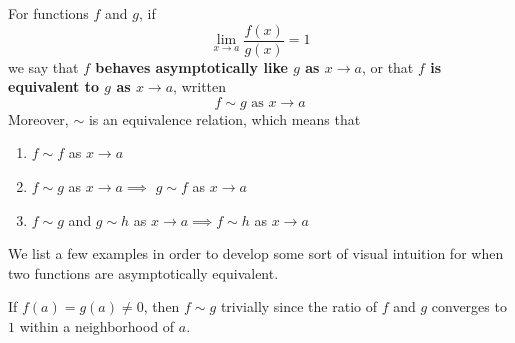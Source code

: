     \begin{definition}
      For functions $f$ and $g$, if 
      \begin{equation}
        \lim_{x \rightarrow a} \frac{f(x)}{g(x)} = 1
      \end{equation}
      we say that \textbf{$f$ behaves asymptotically like $g$ as $x \rightarrow a$}, or that \textbf{$f$ is equivalent to $g$ as $x \rightarrow a$}, written 
      \begin{equation}
        f \sim g \text{ as } x \rightarrow a
      \end{equation}
      Moreover, $\sim$ is an equivalence relation, which means that
      \begin{enumerate}
        \item $f \sim f$ as $x \rightarrow a$
        \item $f \sim g$ as $x \rightarrow a \implies$ $g \sim f$ as $x \rightarrow a$
        \item $f \sim g$ and $g \sim h$ as $x \rightarrow a \implies f \sim h$ as $x \rightarrow a$
      \end{enumerate}
    \end{definition}

    We list a few examples in order to develop some sort of visual intuition for when two functions are asymptotically equivalent. 

    \begin{example}
      If $f(a) = g(a) \neq 0$, then $f \sim g$ trivially since the ratio of $f$ and $g$ converges to $1$ within a neighborhood of $a$. 

      \begin{figure}[H]
        \centering 
        \caption{} 
      \end{figure}
    \end{example}

